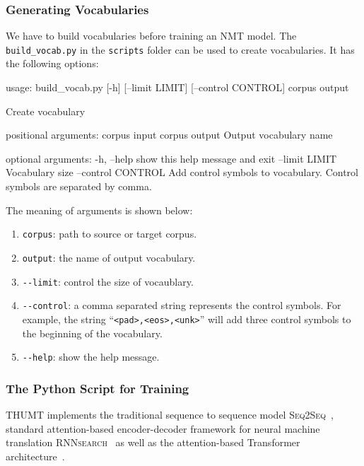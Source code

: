 \documentclass{article}
\begin{document}
\subsubsection{Generating Vocabularies}
We have to build vocabularies before training an NMT model. The \verb|build_vocab.py| in the \verb|scripts| folder can be used to create vocabularies. It has the following options:
\begin{everbatim}
usage: build_vocab.py [-h] [--limit LIMIT] [--control CONTROL]
                      corpus output

Create vocabulary

positional arguments:
  corpus             input corpus
  output             Output vocabulary name

optional arguments:
  -h, --help         show this help message and exit
  --limit LIMIT      Vocabulary size
  --control CONTROL  Add control symbols to vocabulary.
                     Control symbols are separated by comma.
\end{everbatim}

The meaning of arguments is shown below:
\begin{enumerate}
\item \verb|corpus|: path to source or target corpus.
\item \verb|output|: the name of output vocabulary.
\item \verb|--limit|: control the size of vocaublary.
\item \verb|--control|: a comma separated string represents the control symbols. For example, the string ``\verb|<pad>,<eos>,<unk>|'' will add three control symbols to the beginning of the vocabulary.
\item \verb|--help|: show the help message.
\end{enumerate}

\subsubsection{The Python Script for Training}
THUMT implements the traditional sequence to sequence model \textsc{Seq2Seq}~\citep{Sutskever:14}, standard attention-based encoder-decoder framework for neural machine translation \textsc{RNNsearch}~\citep{Bahdanau:15} as well as the attention-based Transformer architecture~\citep{vaswani2017attention}.
\end{document}
